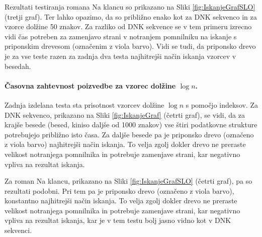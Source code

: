 Rezultati testiranja romana Na klancu so prikazano na Sliki \ref{fig:IskanjeGrafSLO} (tretji graf). Ter lahko opazimo, da so približno enako kot za DNK sekvenco in za vzorce dolžine 50 znakov. Za razliko od DNK sekvence se v tem primeru izrecno vidi čas potreben za zamenjavo strani v notranjem pomnilniku na iskanje s priponskim drevesom (označenim z viola barvo). Vidi se tudi, da priponsko drevo je za vse teste razen za zadnja dva testa najhitrejši način iskanja vzorcev v besedah.

\paragraph{Časovna zahtevnost poizvedbe za vzorec dolžine $\log{n}$.}
Zadnja izdelana testa sta prisotnost vzorcev dolžine $\log{n}$ s pomočjo indeksov. Za DNK sekvenco, prikazano na Sliki \ref{fig:IskanjeGraf} (četrti graf), se vidi, da za krajše besede (besed, kiniso daljše od 1000 znakov) vse štiri podatkovne strukture potrebujejo približno isto časa. Za daljše besede pa je priponsko drevo (označeno z viola barvo) najhitrejši način iskanja. To velja zgolj dokler drevo ne preraste velikost notranjega pomnilnika in potrebuje zamenjave strani, kar negativno vpliva na rezultat iskanja.

Za roman Na klancu, prikazano na Sliki \ref{fig:IskanjeGrafSLO} (četrti graf), pa so rezultati podobni. Pri tem pa je priponsko drevo (označeno z viola barvo), konstantno najhitrejši način iskanja. To velja zgolj dokler drevo ne preraste velikost notranjega pomnilnika in potrebuje zamenjave strani, kar negativno vpliva na rezultat iskanja, kar je v tem testu bolj jasno vidno kot v DNK sekvenci.
